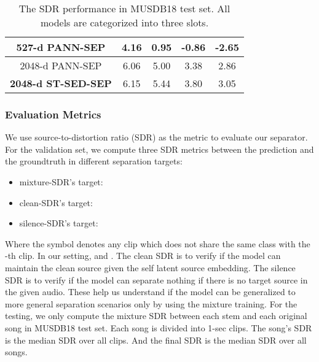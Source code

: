 \documentclass[letterpaper]{article} \usepackage{aaai22}  \usepackage{times}  \usepackage{helvet}  \usepackage{courier}  \usepackage[hyphens]{url}  \usepackage{graphicx} \urlstyle{rm} \def\UrlFont{\rm}  \usepackage{natbib}  \usepackage{caption} \DeclareCaptionStyle{ruled}{labelfont=normalfont,labelsep=colon,strut=off} \frenchspacing  \setlength{\pdfpagewidth}{8.5in}  \setlength{\pdfpageheight}{11in}  \usepackage{algorithm}
\begin{document}
\begin{table}[t]
{\begin{tabular}{|c|c|c|c|c|}
527-d PANN-SEP              & 4.16   & 0.95 & -0.86 & -2.65      \\ \hline
2048-d PANN-SEP                & 6.06          & 5.00 & 3.38 & 2.86         \\ \hline
\textbf{2048-d ST-SED-SEP}      & 6.15           & 5.44           & 3.80  & 3.05  \\ \hline

\end{tabular}}
\caption{The SDR performance in MUSDB18 test set. All models are categorized into three slots. }
\label{tab:exp_cp}
\vspace{-0.5cm}
\end{table}

\begin{table*}[t]
\caption{The SDR performance of the 2048-d ST-SED-SEP in the zero-shot verification experiment. }
\label{tab:exp_zs_f}
\vspace{-0.5cm}
\end{table*}

\subsubsection{Evaluation Metrics}
We use source-to-distortion ratio (SDR) as the metric to evaluate our separator. For the validation set, we compute three SDR metrics between the prediction and the groundtruth in different separation targets:
\begin{itemize}
    \item mixture-SDR's target: 
    \item clean-SDR's target: 
    \item silence-SDR's target: 
\end{itemize}
Where the symbol  denotes any clip which does not share the same class with the -th clip. In our setting,  and . The clean SDR is to verify if the model can maintain the clean source given the self latent source embedding. The silence SDR is to verify if the model can separate nothing if there is no target source in the given audio. These help us understand if the model can be generalized to more general separation scenarios only by using the mixture training. For the testing, we only compute the mixture SDR between each stem and each original song in MUSDB18 test set. Each song is divided into 1-sec clips. The song's SDR is the median SDR over all clips. And the final SDR is the median SDR over all songs.
\end{document}
